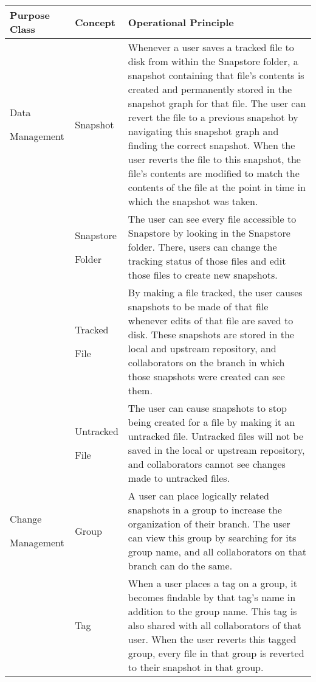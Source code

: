 \begin{table}
\begin{tabular}{ |p{2.25cm}||p{2.25cm}||p{12.5cm}|}
 \hline
 \textbf{Purpose Class} & \textbf{Concept} & \textbf{Operational Principle}\\[8pt]
 \hline
 \parbox[t]{3cm}{Data \par Management\strut} & Snapshot & Whenever a user saves a tracked file to disk from within the Snapstore folder, a snapshot containing that file's contents is created and permanently stored in the snapshot graph for that file. The user can revert the file to a previous snapshot by navigating this snapshot graph and finding the correct snapshot. When the user reverts the file to this snapshot, the file's contents are modified to match the contents of the file at the point in time in which the snapshot was taken.\\[8pt]
  & \parbox[t]{3cm}{Snapstore \par Folder\strut} & The user can see every file accessible to Snapstore by looking in the Snapstore folder. There, users can change the tracking status of those files and edit those files to create new snapshots.\\[8pt]
  & \parbox[t]{3cm}{Tracked \par File\strut} & By making a file tracked, the user causes snapshots to be made of that file whenever edits of that file are saved to disk. These snapshots are stored in the local and upstream repository, and collaborators on the branch in which those snapshots were created can see them.\\[8pt]
  & \parbox[t]{3cm}{Untracked \par File\strut} & The user can cause snapshots to stop being created for a file by making it an untracked file. Untracked files will not be saved in the local or upstream repository, and collaborators cannot see changes made to untracked files.\\[8pt]
 \hline
 \parbox[t]{3cm}{Change \par Management\strut} & Group & A user can place logically related snapshots in a group to increase the organization of their branch. The user can view this group by searching for its group name, and all collaborators on that branch can do the same.\\[8pt]
  & Tag & When a user places a tag on a group, it becomes findable by that tag's name in addition to the group name. This tag is also shared with all collaborators of that user. When the user reverts this tagged group, every file in that group is reverted to their snapshot in that group.\\[8pt]

\end{tabular}
\end{table}
